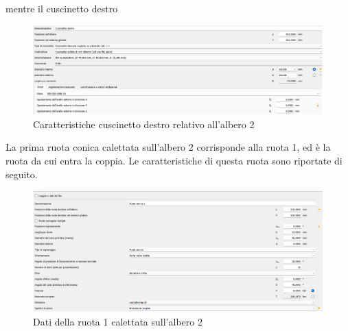 mentre il cuscinetto destro
\begin{figure}[h]
    \centering
    \includegraphics[scale=0.45]{Immagini/CuscinettoDestraAlbero2.png}
    \caption{Caratteristiche cuscinetto destro relativo all'albero 2}
    \label{fig:CuscinettoDestraAlbero2}
\end{figure}
\newpage
La prima ruota conica calettata sull'albero 2 corrisponde alla ruota 1, ed è la ruota da cui entra la coppia. Le caratteristiche di questa ruota sono riportate di seguito.
\begin{figure}[h]
    \centering
    \includegraphics[scale=0.45]{Immagini/Ruota1Albero2.png}
    \caption{Dati della ruota 1 calettata sull'albero 2}
    \label{fig:Ruota1Albero2}
\end{figure}

